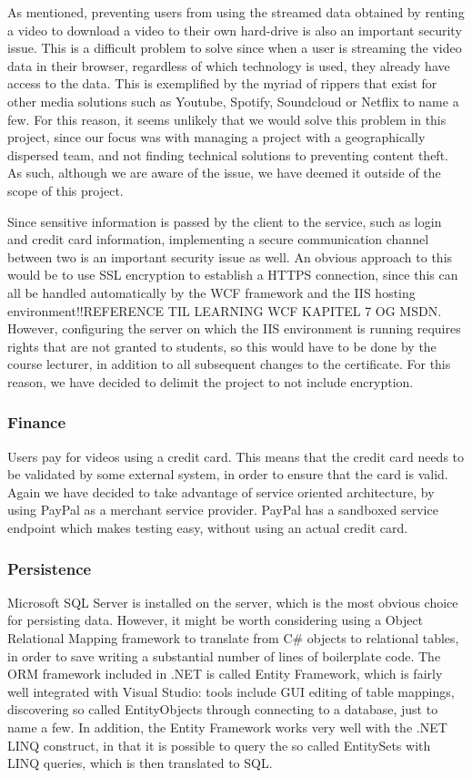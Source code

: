 As mentioned, preventing users from using the streamed data obtained by renting a video to download a video to their own hard-drive is also an important security issue. This is a difficult problem to solve since when a user is streaming the video data in their browser, regardless of which technology is used, they already have access to the data. This is exemplified by the myriad of rippers that exist for other media solutions such as Youtube, Spotify, Soundcloud or Netflix to name a few. For this reason, it seems unlikely that we would solve this problem in this project, since our focus was with managing a project with a geographically dispersed team, and not finding technical solutions to preventing content theft. As such, although we are aware of the issue, we have deemed it outside of the scope of this project.

Since sensitive information is passed by the client to the service, such as login and credit card information, implementing a secure communication channel between two is an important security issue as well. An obvious approach to this would be to use SSL encryption to establish a HTTPS connection, since this can all be handled automatically by the WCF framework and the IIS hosting environment!!REFERENCE TIL LEARNING WCF KAPITEL 7 OG MSDN. However, configuring the server on which  the IIS environment is running requires rights that are not granted to students, so this would have to be done by the course lecturer, in addition to all subsequent changes to the certificate. For this reason, we have decided to delimit the project to not include encryption.

\subsubsection{Finance} \label{Paypal}
Users pay for videos using a credit card. This means that the credit card needs to be validated by some external system, in order to ensure that the card is valid. Again we have decided to take advantage of service oriented architecture, by using PayPal as a merchant service provider. PayPal has a sandboxed service endpoint which makes testing easy, without using an actual credit card.

\subsubsection{Persistence}
Microsoft SQL Server is installed on the server, which is the most obvious choice for persisting data. However, it might be worth considering using a Object Relational Mapping framework to translate from C\# objects to relational tables, in order to save writing a substantial number of lines of boilerplate code. The ORM framework included in .NET is called Entity Framework, which is fairly well integrated with Visual Studio: tools include GUI editing of table mappings, discovering so called EntityObjects through connecting to a database, just to name a few. In addition, the Entity Framework works very well with the .NET LINQ construct, in that it is possible to query the so called EntitySets with LINQ queries, which is then translated to SQL.

